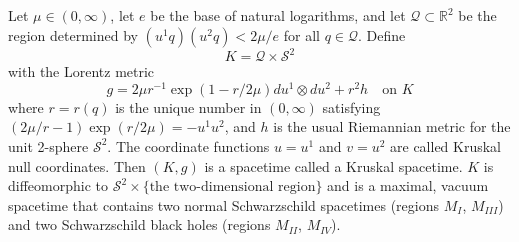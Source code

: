 Let $\mu \in (0,\infty)$, let $e$ be the base of natural logarithms, and let $\mathcal{Q} \subset \mathbb{R}^2$ be the region determined by $(u^1 q)(u^2 q) < 2\mu/e$ for all $q \in \mathcal{Q}$. Define
$$K = \mathcal{Q} \times \mathcal{S}^2$$
with the Lorentz metric
$$g = 2\mu r^{-1} \exp(1 - r/2\mu) du^1 \otimes du^2 + r^2 h \quad \text{on } K$$
where $r = r(q)$ is the unique number in $(0,\infty)$ satisfying $(2\mu/r - 1) \exp(r/2\mu) = -u^1 u^2$, and $h$ is the usual Riemannian metric for the unit 2-sphere $\mathcal{S}^2$. The coordinate functions $u = u^1$ and $v = u^2$ are called Kruskal null coordinates. Then $(K,g)$ is a spacetime called a Kruskal spacetime. $K$ is diffeomorphic to $\mathcal{S}^2 \times \{\text{the two-dimensional region}\}$ and is a maximal, vacuum spacetime that contains two normal Schwarzschild spacetimes (regions $M_I$, $M_{III}$) and two Schwarzschild black holes (regions $M_{II}$, $M_{IV}$).
